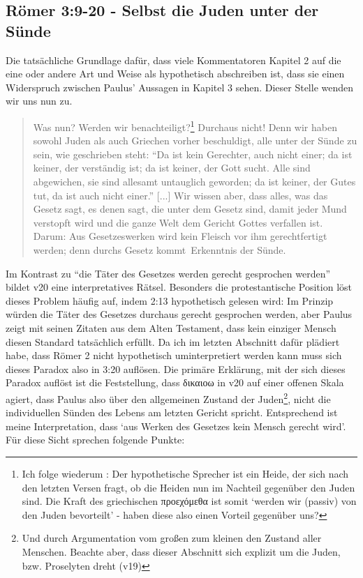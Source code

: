 \subsection{Römer 3:9-20 - Selbst die Juden unter der Sünde}
Die tatsächliche Grundlage dafür, dass viele Kommentatoren Kapitel 2 auf die eine oder andere Art und Weise als hypothetisch abschreiben ist,
dass sie einen Widerspruch zwischen Paulus' Aussagen in Kapitel 3 sehen. Dieser Stelle wenden wir uns nun zu.
\begin{quote}
	Was nun? Werden wir benachteiligt?\footnote{
		Ich folge wiederum \Cite[S.94]{the-so-called-jew}: Der hypothetische Sprecher ist ein Heide, der sich nach den letzten Versen fragt,
		ob die Heiden nun im Nachteil gegenüber den Juden sind.
		Die Kraft des griechischen προεχόμεθα ist somit `werden wir (passiv) von den Juden bevorteilt' - haben diese also einen Vorteil gegenüber uns?
	}
	Durchaus nicht! Denn wir haben sowohl Juden als auch Griechen vorher beschuldigt, alle unter der Sünde zu sein,
	wie geschrieben steht: ``Da ist kein Gerechter, auch nicht einer; da ist keiner, der verständig ist; da ist keiner, der Gott sucht.
	Alle sind abgewichen, sie sind allesamt untauglich geworden; da ist keiner, der Gutes tut, da ist auch nicht einer.''
	[...]
	Wir wissen aber, dass alles, was das Gesetz sagt, es denen sagt, die unter dem Gesetz sind,
	damit jeder Mund verstopft wird und die ganze Welt dem Gericht Gottes verfallen ist.
	Darum: Aus Gesetzeswerken wird kein Fleisch vor ihm gerechtfertigt werden;
	denn durchs Gesetz \textlangle kommt\textrangle\ Erkenntnis der Sünde.
\end{quote}
Im Kontrast zu  ``die Täter des Gesetzes werden gerecht gesprochen werden'' bildet v20 eine interpretatives Rätsel.
Besonders die protestantische Position löst dieses Problem häufig auf, indem 2:13 hypothetisch gelesen wird: Im Prinzip würden die Täter des Gesetzes durchaus
gerecht gesprochen werden, aber Paulus zeigt mit seinen Zitaten aus dem Alten Testament, dass kein einziger Mensch diesen Standard tatsächlich erfüllt.
Da ich im letzten Abschnitt dafür plädiert habe, dass Römer 2 nicht hypothetisch uminterpretiert werden kann muss sich dieses Paradox also in 3:20 auflösen.
Die primäre Erklärung, mit der sich dieses Paradox auflöst ist die Feststellung, dass δικαιοω in v20 auf einer offenen Skala agiert, dass Paulus
also über den allgemeinen Zustand der Juden\footnote{
	Und durch Argumentation vom großen zum kleinen den Zustand aller Menschen.
	Beachte aber, dass dieser Abschnitt sich explizit um die Juden, bzw. Proselyten dreht (v19)
}, nicht die individuellen Sünden des Lebens am letzten Gericht spricht.
Entsprechend ist meine Interpretation, dass `aus Werken des Gesetzes kein Mensch gerecht wird'.
Für diese Sicht sprechen folgende Punkte:

